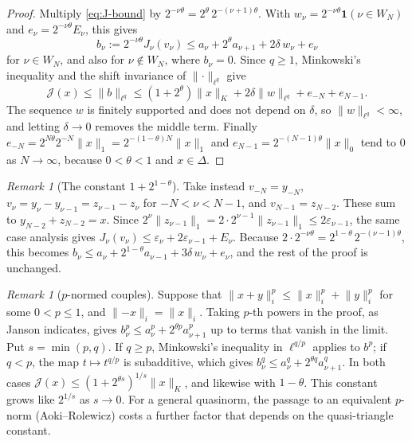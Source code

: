 \documentclass[11pt]{article}
\theoremstyle{remark}
\newtheorem{remark}[theorem]{Remark}
\newcommand{\norm}[2]{\lVert #1\rVert_{#2}}
\newcommand{\cJ}{\mathcal J}
\newcommand{\one}{\mathbf 1}
\begin{document}
\begin{proof}
  Multiply \eqref{eq:J-bound} by \(2^{-\nu\theta} = 2^\theta\, 2^{-(\nu+1)\theta}\). With
  \(w_\nu = 2^{-\nu\theta}\one(\nu \in W_N)\) and \(e_\nu = 2^{-\nu\theta}E_\nu\), this gives
  \[
    b_\nu := 2^{-\nu\theta}J_\nu(v_\nu) \le a_\nu + 2^\theta a_{\nu+1} + 2\delta\, w_\nu + e_\nu
  \]
  for \(\nu \in W_N\), and also for \(\nu \notin W_N\), where \(b_\nu = 0\). Since
  \(q \ge 1\), Minkowski's inequality and the shift invariance of \(\norm{\cdot}{\ell^q}\) give
  \[
    \cJ(x) \le \norm{b}{\ell^q}
    \le (1 + 2^\theta)\norm{x}{K} + 2\delta\norm{w}{\ell^q} + e_{-N} + e_{N-1}.
  \]
  The sequence \(w\) is finitely supported and does not depend on \(\delta\), so
  \(\norm{w}{\ell^q} < \infty\), and letting \(\delta \to 0\) removes the middle term. Finally
  \(e_{-N} = 2^{N\theta}2^{-N}\norm{x}{1} = 2^{-(1-\theta)N}\norm{x}{1}\) and
  \(e_{N-1} = 2^{-(N-1)\theta}\norm{x}{0}\) tend to \(0\) as \(N \to \infty\), because
  \(0 < \theta < 1\) and \(x \in \Delta\).
\end{proof}

\begin{remark}[The constant \(1 + 2^{1-\theta}\)]\label{rem:other-shift}
  Take instead \(v_{-N} = y_{-N}\), \(v_\nu = y_\nu - y_{\nu-1} = z_{\nu-1} - z_\nu\) for
  \(-N < \nu < N-1\), and \(v_{N-1} = z_{N-2}\). These sum to
  \(y_{N-2} + z_{N-2} = x\). Since \(2^\nu\norm{z_{\nu-1}}{1} = 2\cdot 2^{\nu-1}\norm{z_{\nu-1}}{1}
  \le 2\varepsilon_{\nu-1}\), the same case analysis gives
  \(J_\nu(v_\nu) \le \varepsilon_\nu + 2\varepsilon_{\nu-1} + E_\nu\). Because
  \(2\cdot 2^{-\nu\theta} = 2^{1-\theta}\,2^{-(\nu-1)\theta}\), this becomes
  \(b_\nu \le a_\nu + 2^{1-\theta}a_{\nu-1} + 3\delta\, w_\nu + e_\nu\), and the rest of the
  proof is unchanged.
\end{remark}

\begin{remark}[\(p\)-normed couples]
  Suppose that \(\norm{x+y}{i}^p \le \norm{x}{i}^p + \norm{y}{i}^p\) for some
  \(0 < p \le 1\), and \(\norm{-x}{i} = \norm{x}{i}\). Taking \(p\)-th powers in the proof,
  as Janson indicates, gives
  \(b_\nu^p \le a_\nu^p + 2^{\theta p}a_{\nu+1}^p\) up to terms that vanish in the limit. Put
  \(s = \min(p, q)\). If \(q \ge p\), Minkowski's inequality in \(\ell^{q/p}\) applies to
  \(b^p\); if \(q < p\), the map \(t \mapsto t^{q/p}\) is subadditive, which gives
  \(b_\nu^q \le a_\nu^q + 2^{\theta q}a_{\nu+1}^q\). In both cases
  \(\cJ(x) \le (1 + 2^{\theta s})^{1/s}\norm{x}{K}\), and likewise with \(1-\theta\). This
  constant grows like \(2^{1/s}\) as \(s \to 0\). For a general quasinorm, the passage to an
  equivalent \(p\)-norm (Aoki--Rolewicz) costs a further factor that depends on the
  quasi-triangle constant.
\end{remark}
\end{document}
